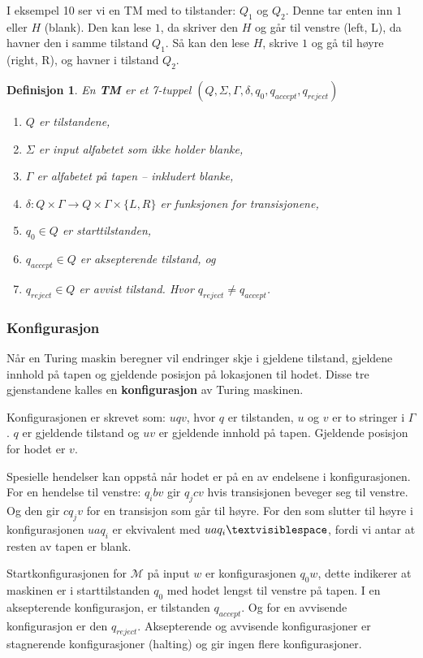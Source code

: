 \documentclass[11pt,a4paper]{article}
\begin{document}
I eksempel 10 ser vi en TM med to tilstander: $Q_1$ og $Q_2$. Denne tar enten inn $1$ eller $H$ (blank). Den kan lese $1$, da skriver den $H$ og går til venstre (left, L), da havner den i samme tilstand $Q_1$. Så kan den lese $H$, skrive $1$ og gå til høyre (right, R), og havner i tilstand $Q_2$.

\theoremstyle{mytheoremstyle}
\newtheorem{tm}{Definisjon}[section]
\begin{tm}
En \textbf{TM} er et 7-tuppel $(Q, \Sigma, \Gamma, \delta, q_0, q_{accept}, q_{reject})$
\begin{enumerate}
\item{$Q$ er tilstandene,}
\item{$\Sigma$ er input alfabetet som ikke holder blanke,}
\item{$\Gamma$ er alfabetet på tapen -- inkludert blanke,}
\item{$\delta : Q \times \Gamma \rightarrow Q \times \Gamma \times \{L, R\}$ er funksjonen for transisjonene,}
\item{$q_0 \in Q$ er starttilstanden,}
\item{$q_{accept} \in Q$ er aksepterende tilstand, og}
\item{$q_{reject} \in Q$ er avvist tilstand. Hvor $q_{reject} \neq q_{accept}$}.
\end{enumerate}
\end{tm}

\subsubsection{Konfigurasjon}
Når en Turing maskin beregner vil endringer skje i gjeldene tilstand, gjeldene innhold på tapen og gjeldende posisjon på lokasjonen til hodet. Disse tre gjenstandene kalles en \textbf{konfigurasjon} av Turing maskinen.

Konfigurasjonen er skrevet som: $uqv$, hvor $q$ er tilstanden, $u$ og $v$ er to stringer i $\Gamma$. $q$ er gjeldende tilstand og $uv$ er gjeldende innhold på tapen. Gjeldende posisjon for hodet er $v$.

Spesielle hendelser kan oppstå når hodet er på en av endelsene i konfigurasjonen. For en hendelse til venstre: $q_ibv$ gir $q_jcv$ hvis transisjonen beveger seg til venstre. Og den gir $cq_jv$ for en transisjon som går til høyre. For den som slutter til høyre i konfigurasjonen $uaq_i$ er ekvivalent med $uaq_i\textvisiblespace$, fordi vi antar at resten av tapen er blank.

Startkonfigurasjonen for $\mathcal{M}$ på input $w$ er konfigurasjonen $q_0w$, dette indikerer at maskinen er i starttilstanden $q_0$ med hodet lengst til venstre på tapen. I en aksepterende konfigurasjon, er tilstanden $q_{accept}$. Og for en avvisende konfigurasjon er den $q_{reject}$. Aksepterende og avvisende konfigurasjoner er stagnerende konfigurasjoner (halting) og gir ingen flere konfigurasjoner.
\end{document}
